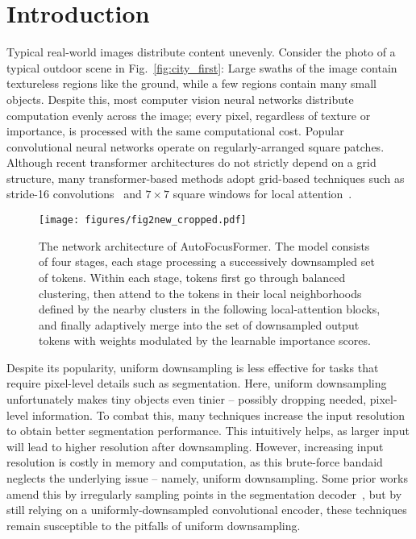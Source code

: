 \documentclass[10pt,twocolumn,letterpaper]{article}
\begin{document}
\section{Introduction}
\label{sec:intro}



Typical real-world images distribute content unevenly. Consider the photo of a typical outdoor scene in Fig.~\ref{fig:city_first}: Large swaths of the image contain textureless regions like the ground, while a few regions contain many small objects. Despite this, most computer vision neural networks distribute computation evenly across the image; every pixel, regardless of texture or importance, is processed with the same computational cost. Popular convolutional neural networks operate on regularly-arranged square patches. Although recent transformer architectures do not strictly depend on a grid structure, many transformer-based methods adopt grid-based techniques such as stride-16 convolutions~\cite{vit} and $7\times 7$ square windows for local attention~\cite{swin}.

\begin{figure*}[t]
    \centering
    \texttt{[image: figures/fig2new\_cropped.pdf]}
    \vskip -0.1in
    \caption{The network architecture of AutoFocusFormer. The model consists of four stages, each stage processing a successively downsampled set of tokens. Within each stage, tokens first go through balanced clustering, then attend to the tokens in their local neighborhoods defined by the nearby clusters in the following local-attention blocks, and finally adaptively merge into the set of downsampled output tokens with weights modulated by the learnable importance scores.}
    \label{fig:flowchart}
    \vskip -0.15in
\end{figure*}

Despite its popularity, uniform downsampling is less effective for tasks that require pixel-level details such as segmentation. Here, uniform downsampling unfortunately makes tiny objects even tinier -- possibly dropping needed, pixel-level information. To combat this, many techniques increase the input resolution~\cite{sniper, du2021simple} to obtain better segmentation performance. This intuitively helps, as larger input will lead to higher resolution after downsampling. However, increasing input resolution is costly in memory and computation, as this brute-force bandaid neglects the underlying issue -- namely, uniform downsampling. Some prior works amend this by irregularly sampling points in the segmentation decoder~\cite{kirillov2020pointrend}, but by still relying on a uniformly-downsampled convolutional encoder, these techniques remain susceptible to the pitfalls of uniform downsampling.
\end{document}
